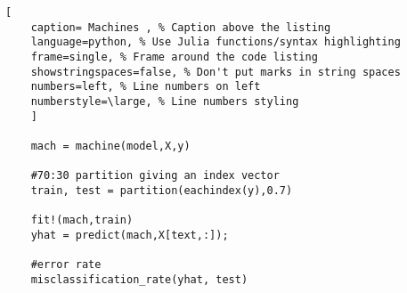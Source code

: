 \documentclass[11pt]{scrartcl} %
\begin{document}
\begin{lstlisting}[
	caption= Machines , % Caption above the listing
	language=python, % Use Julia functions/syntax highlighting
	frame=single, % Frame around the code listing
	showstringspaces=false, % Don't put marks in string spaces
	numbers=left, % Line numbers on left
	numberstyle=\large, % Line numbers styling
	]

	mach = machine(model,X,y)
	
	#70:30 partition giving an index vector
	train, test = partition(eachindex(y),0.7)

	fit!(mach,train)
	yhat = predict(mach,X[text,:]);

	#error rate
	misclassification_rate(yhat, test)

\end{lstlisting}






\end{document}
